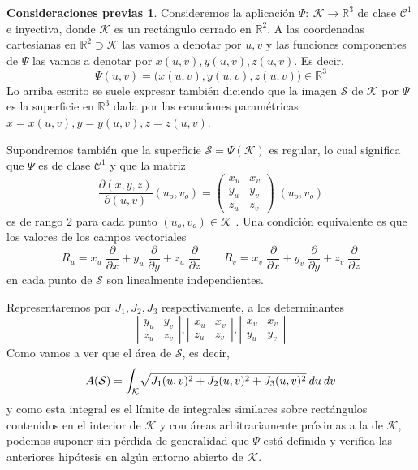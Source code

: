 \documentclass[12pt,twoside]{report}
\newcommand\mc[1]{\mathcal{#1}}
\theoremstyle{azul}
\theoremstyle{azul2}
\theoremstyle{plain}
\theoremstyle{definition}
\newtheorem*{consprev}{Consideraciones previas}
\theoremstyle{remark}
\begin{document}
\begin{consprev}

Consideremos la aplicación $\Psi: \: \mc{K} \longrightarrow \mathbb{R}^3$ de clase $\mc{C}^1$ e inyectiva, donde $\mc{K}$ es un rectángulo cerrado en $\mathbb{R}^2$. A las coordenadas cartesianas en $\mathbb{R}^2 \supset \mc{K}$ las vamos a denotar por $u,v$  y las funciones componentes de $\Psi$ las vamos a denotar por $x(u,v), y(u,v), z(u,v)$. Es decir, 
$$\Psi(u,v) = \big( x(u,v), y(u,v), z(u,v) \big) \in \mathbb{R}^3$$
Lo arriba escrito se suele expresar también diciendo que la imagen $\mc{S}$ de $\mc{K}$ por $\Psi$ es la superficie en $\mathbb{R}^3$ dada por las ecuaciones paramétricas $x=x(u,v), y=y(u,v), z=z(u,v)$. 

Supondremos también que la superficie $\mc{S}=\Psi(\mc{K})$ es regular, lo cual significa que $\Psi$ es de clase $\mc{C}^1$ y que la matriz $$\frac{\partial(x,y,z)}{\partial(u,v)}(u_o, v_o) = \left(\begin{array}{cc}
     x_u & x_v \\
     y_u & y_v \\
     z_u & z_v
\end{array} \right) \; (u_o, v_o)$$ es de rango 2 para cada punto $(u_o, v_o) \in \mc{K}$ . Una condición equivalente es que los valores de los campos vectoriales $$R_u = x_u \; \dfrac{\partial }{\partial x} + y_u \; \dfrac{\partial}{\partial y} + z_u \; \dfrac{\partial}{ \partial z} \qquad R_v= x_v \; \dfrac{\partial }{\partial x} + y_v \; \dfrac{\partial}{\partial y} + z_v \; \dfrac{\partial}{ \partial z}$$ en cada punto de $\mc{S}$ son linealmente independientes.

Representaremos por $J_1, J_2, J_3$ respectivamente, a los determinantes $$\left| \begin{array}{cc}
     y_u & y_v  \\
     z_u & z_v
\end{array}\right|, \left| \begin{array}{cc}
     x_u & x_v  \\
     z_u & z_v
\end{array}\right|, \left| \begin{array}{cc}
     x_u & x_v  \\
     y_u & y_v
\end{array}\right|$$
Como vamos a ver que el área de $\mc{S}$, es decir, 
$$A(\mc{S})= \mathlarger{\int}_{\mc{K}} \sqrt{J_1(u,v)^2+J_2(u,v)^2+J_3(u,v)^2 } \: du \: dv$$
 y como esta integral es el límite de integrales similares sobre rectángulos contenidos en el interior de $\mc{K}$ y con áreas arbitrariamente próximas a la de $\mc{K}$, podemos suponer sin pérdida de generalidad que $\Psi$ está definida y verifica las anteriores hipótesis en algún entorno abierto de $\mc{K}$.
 

\end{consprev}
\end{document}
